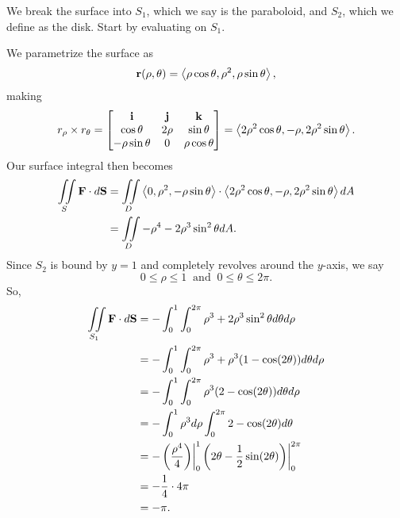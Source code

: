 \begin{soln}
    We break the surface into $S_{1}$, which we say is the paraboloid, and $S_{2}$, which we define as the disk. Start by evaluating on $S_{1}$.

    We parametrize the surface as
    \[\mathbf{r}(\rho, \theta) = \left<\rho\cos\theta, \rho^{2}, \rho\sin\theta\right>,\]
    making
    \[r_{\rho} \times r_{\theta} = \begin{bmatrix}
        \mathbf{i} & \mathbf{j} & \mathbf{k} \\
        \cos\theta & 2\rho & \sin\theta \\
        -\rho\sin\theta & 0 & \rho\cos\theta
    \end{bmatrix} = \left<2\rho^{2}\cos\theta, -\rho, 2\rho^{2}\sin\theta\right>.\]
    Our surface integral then becomes
    \begin{align*}
        \iint\limits_{S}\mathbf{F} \cdot d\mathbf{S} &= \iint\limits_{D}\left<0, \rho^{2}, -\rho\sin\theta\right> \cdot \left<2\rho^{2}\cos\theta, -\rho, 2\rho^{2}\sin\theta\right>dA \\
        &= \iint\limits_{D} -\rho^{4} - 2\rho^{3}\sin^{2}\theta dA.
    \end{align*}
    Since $S_{2}$ is bound by $y = 1$ and completely revolves around the $y$-axis, we say
    \[0 \leq \rho \leq 1 \;\; \text{and} \;\; 0 \leq \theta \leq 2\pi.\]
    So,
    \begin{align*}
        \iint\limits_{S_{1}}\mathbf{F} \cdot d\mathbf{S} &= -\int_{0}^{1}\int_{0}^{2\pi} \rho^{3} + 2\rho^{3}\sin^{2}\theta d\theta d\rho \\
        &= -\int_{0}^{1}\int_{0}^{2\pi} \rho^{3} + \rho^{3}(1 - \cos(2\theta)) d\theta d\rho \\
        &= -\int_{0}^{1}\int_{0}^{2\pi} \rho^{3}(2 - \cos(2\theta)) d\theta d\rho \\
        &= -\int_{0}^{1} \rho^{3} d\rho \int_{0}^{2\pi} 2 - \cos(2\theta) d\theta \\
        &= -\left(\frac{\rho^{4}}{4}\right) \biggr\rvert_{0}^{1} \left(2\theta - \frac{1}{2}\sin(2\theta)\right) \biggr\rvert_{0}^{2\pi} \\
        &= -\frac{1}{4} \cdot 4\pi \\
        &= -\pi.
    \end{align*}
    

\end{soln}
